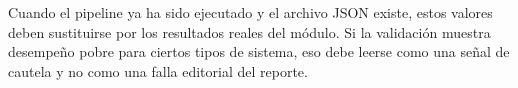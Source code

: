 Cuando el pipeline ya ha sido ejecutado y el archivo JSON existe, estos valores deben sustituirse por los resultados reales del m\'odulo. Si la validaci\'on muestra desempe\~no pobre para ciertos tipos de sistema, eso debe leerse como una se\~nal de cautela y no como una falla editorial del reporte.
